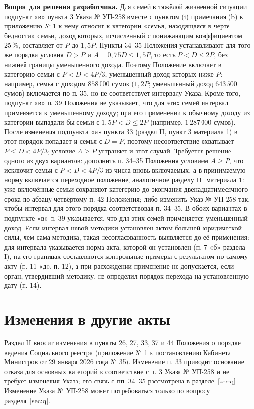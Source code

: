 \documentclass[14pt,a4paper]{extarticle}
\begin{document}
\textbf{Вопрос для решения разработчика.} Для семей в тяжёлой жизненной ситуации подпункт «в» пункта 3 Указа № УП-258 вместе с пунктом (i) примечания (b) к приложению № 1 к нему относит к категории «семья, находящаяся в черте бедности» семьи, доход которых, исчисленный с понижающим коэффициентом 25\,\%, составляет от $P$ до $1{,}5P$\cite{pf258}. Пункты 34–35 Положения устанавливают для того же порядка условия $D>P$ и $A=0{,}75D\le1{,}5P$, то есть $P<D\le2P$, без нижней границы уменьшенного дохода. Поэтому Положение включает в категорию семьи с $P<D<4P/3$, уменьшенный доход которых ниже $P$: например, семья с доходом $858\,000$ сумов ($1{,}2P$; уменьшенный доход $643\,500$ сумов) включается по п. 35, но не соответствует интервалу Указа. Кроме того, подпункт «в» п. 39 Положения не указывает, что для этих семей интервал применяется к уменьшенному доходу; при его применении к обычному доходу из категории выпадали бы семьи с $1{,}5P<D\le2P$ (например, $1\,287\,000$ сумов). После изменения подпункта «а» пункта 33 (раздел II, пункт 3 материала 1) в этот порядок попадает и семья с $D=P$, поэтому несоответствие охватывает $P\le D<4P/3$; условие $A\ge P$ устраняет и этот случай. Требуется решение одного из двух вариантов: дополнить п. 34–35 Положения условием $A\ge P$, что исключит семьи с $P<D<4P/3$ из числа вновь включаемых, а в принимаемую норму включается переходное положение, аналогичное разделу III материала 1: уже включённые семьи сохраняют категорию до окончания двенадцатимесячного срока по абзацу четвёртому п. 42 Положения; либо изменить Указ № УП-258 так, чтобы интервал для этого порядка соответствовал п. 34–35. В обоих вариантах в подпункте «в» п. 39 указывается, что для этих семей применяется уменьшенный доход. Если интервал новой методики установлен актом большей юридической силы, чем сама методика, такая несогласованность выявляется до её применения: для интервала указывается норма акта, которой он установлен (п. 7 «б» раздела I), на его границах составляются контрольные примеры с результатом по самому акту (п. 11 «д», п. 12), а при расхождении применение не допускается, если орган, утвердивший методику, не определил порядок перехода на установленную дату (п. 14).

\section{Изменения в другие акты}
Раздел II вносит изменения в пункты 26, 27, 33, 37 и 44 Положения о порядке ведения Социального реестра (приложение № 1 к постановлению Кабинета Министров от 29 января 2026 года № 35). Изменение п. 33 приводит основание отказа для основных категорий в соответствие с п. 3 Указа № УП-258 и не требует изменения Указа; его связь с пп. 34–35 рассмотрена в разделе~\ref{sec:q}. Изменение Указа № УП-258 может потребоваться только по вопросу раздела~\ref{sec:q}.
\end{document}
